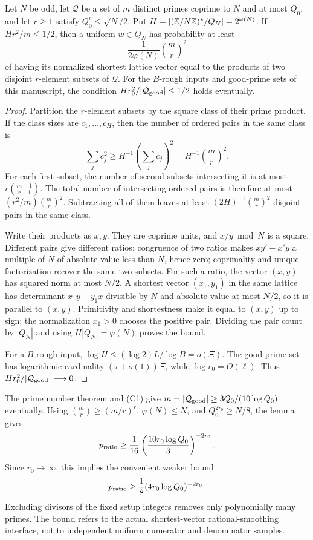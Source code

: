 \begin{lemma}
\label{rf:rough-ratios}
Let $N$ be odd, let $\mathcal Q$ be a set of $m$ distinct primes
coprime to $N$ and at most $Q_0$, and let $r\ge1$ satisfy
$Q_0^r\le\sqrt N/2$.  Put
$H=|(\mathbb Z/N\mathbb Z)^*/Q_N|=2^{\omega(N)}$.
If $Hr^2/m\le1/2$, then a uniform $w\in Q_N$ has probability
at least
\[
 \frac1{2\varphi(N)}\binom mr^2
\]
of having its normalized shortest lattice vector equal to the
products of two disjoint $r$-element subsets of $\mathcal Q$.
For the $B$-rough inputs and good-prime sets of this manuscript,
the condition $Hr_0^2/|\mathcal Q_{\rm good}|\le1/2$ holds
eventually.
\end{lemma}
\begin{proof}
Partition the $r$-element subsets by the square class of their
prime product.  If the class sizes are $c_1,\ldots,c_H$, then
the number of ordered pairs in the same class is
\[
 \sum_jc_j^2\ge H^{-1}\left(\sum_jc_j\right)^2
                  =H^{-1}\binom mr^2.
\]
For each first subset, the number of second subsets intersecting
it is at most $r\binom{m-1}{r-1}$.
The total number of intersecting ordered pairs is therefore at
most $(r^2/m)\binom mr^2$.  Subtracting all of them leaves at
least $(2H)^{-1}\binom mr^2$ disjoint pairs in the same class.

Write their products as $x,y$.  They are coprime units, and
$x/y\bmod N$ is a square.  Different pairs give different ratios:
congruence of two ratios makes $xy'-x'y$ a multiple of $N$ of
absolute value less than $N$, hence zero; coprimality and unique
factorization recover the same two subsets.  For such a ratio,
the vector $(x,y)$ has squared norm at most $N/2$.  A shortest
vector $(x_1,y_1)$ in the same lattice has determinant
$x_1y-y_1x$ divisible by $N$ and absolute value at most $N/2$,
so it is parallel to $(x,y)$.  Primitivity and shortestness make
it equal to $(x,y)$ up to sign; the normalization $x_1>0$
chooses the positive pair.  Dividing the pair count by $|Q_N|$
and using $H|Q_N|=\varphi(N)$ proves the bound.

For a $B$-rough input,
$\log H\le(\log2)L/\log B=o(\Xi)$.
The good-prime set has logarithmic cardinality
$(\tau+o(1))\Xi$, while $\log r_0=O(\ell)$.
Thus $Hr_0^2/|\mathcal Q_{\rm good}|\longrightarrow0$.
\end{proof}

The prime number theorem and \textup{(C1)} give
$m=|\mathcal Q_{\rm good}|\ge3Q_0/(10\log Q_0)$ eventually.
Using $\binom mr\ge(m/r)^r$, $\varphi(N)\le N$, and
$Q_0^{2r_0}\ge N/8$, the lemma gives
\[
 p_{\rm ratio}\ge\frac1{16}
     \left(\frac{10r_0\log Q_0}{3}\right)^{-2r_0}.
\]
Since $r_0\longrightarrow\infty$, this implies the convenient
weaker bound
\begin{equation}
 p_{\rm ratio}\ge
 \frac18(4r_0\log Q_0)^{-2r_0}.
 \label{rf:ratiobound}
\end{equation}
Excluding divisors of the fixed setup integers removes only
polynomially many primes.  The bound refers
to the actual shortest-vector rational-smoothing interface, not
to independent uniform numerator and denominator samples.

